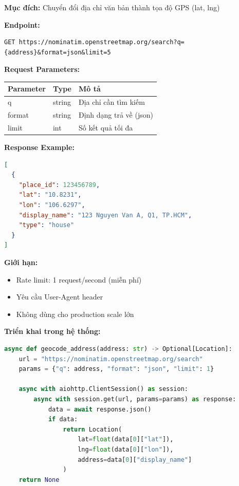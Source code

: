 \documentclass[12pt,a4paper,openany,oneside]{report}
\begin{document}
\textbf{Mục đích:} Chuyển đổi địa chỉ văn bản thành tọa độ GPS (lat, lng)

\textbf{Endpoint:}
\begin{lstlisting}[breaklines]
GET https://nominatim.openstreetmap.org/search?q={address}&format=json&limit=5
\end{lstlisting}

\textbf{Request Parameters:}
\begin{table}[h]
\centering
\begin{tabular}{@{}lll@{}}
\toprule
\textbf{Parameter} & \textbf{Type} & \textbf{Mô tả} \\
\midrule
q & string & Địa chỉ cần tìm kiếm \\
format & string & Định dạng trả về (json) \\
limit & int & Số kết quả tối đa \\
\bottomrule
\end{tabular}
\end{table}

\textbf{Response Example:}
\begin{lstlisting}[language=json]
[
  {
    "place_id": 123456789,
    "lat": "10.8231",
    "lon": "106.6297",
    "display_name": "123 Nguyen Van A, Q1, TP.HCM",
    "type": "house"
  }
]
\end{lstlisting}

\textbf{Giới hạn:}
\begin{itemize}
    \item Rate limit: 1 request/second (miễn phí)
    \item Yêu cầu User-Agent header
    \item Không dùng cho production scale lớn
\end{itemize}

\textbf{Triển khai trong hệ thống:}
\begin{lstlisting}[language=Python]
async def geocode_address(address: str) -> Optional[Location]:
    url = "https://nominatim.openstreetmap.org/search"
    params = {"q": address, "format": "json", "limit": 1}
    
    async with aiohttp.ClientSession() as session:
        async with session.get(url, params=params) as response:
            data = await response.json()
            if data:
                return Location(
                    lat=float(data[0]["lat"]),
                    lng=float(data[0]["lon"]),
                    address=data[0]["display_name"]
                )
    return None
\end{lstlisting}
\end{document}
